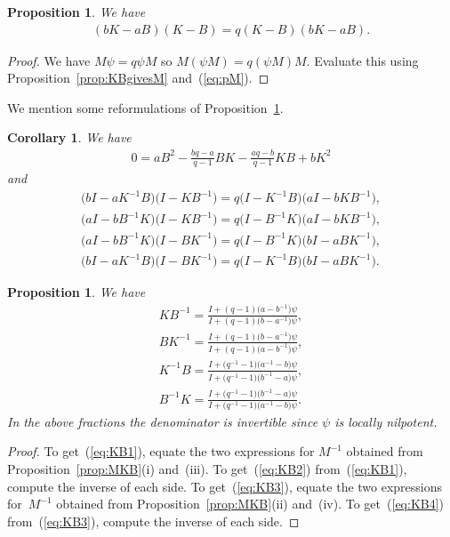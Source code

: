 \documentclass[pdftex]{sigma}
\numberwithin{equation}{section}
\newtheorem{Corollary}[Theorem]{Corollary}
\newtheorem{Proposition}[Theorem]{Proposition}
\begin{document}
\begin{Proposition}\label{thm:BKBK}
We have
\begin{gather*}
(bK-aB)(K-B) = q(K-B)(bK-aB).
\end{gather*}
\end{Proposition}
\begin{proof} We have $M\psi = q \psi M$ so
$M (\psi M) = q (\psi M) M$.
Evaluate this using Proposition~\ref{prop:KBgivesM} and~(\ref{eq:pM}).
\end{proof}

We mention some reformulations of Proposition~\ref{thm:BKBK}.

\begin{Corollary}\label{lem:altrel}
We have
\begin{gather*}
0 = aB^2-\frac{bq-a}{q-1} BK - \frac{aq-b}{q-1}KB + bK^2
\end{gather*}
and
\begin{gather*}
\big(bI-aK^{-1}B\big)\big(I-KB^{-1}\big) = q \big(I-K^{-1}B\big)\big(aI-bKB^{-1}\big),
\\
\big(aI-bB^{-1}K\big)\big(I-KB^{-1}\big) = q \big(I-B^{-1}K\big)\big(aI-bKB^{-1}\big),
\\
\big(aI-bB^{-1}K\big)\big(I-BK^{-1}\big) = q \big(I-B^{-1}K\big)\big(bI-aBK^{-1}\big),
\\
\big(bI-aK^{-1}B\big)\big(I-BK^{-1}\big) = q \big(I-K^{-1}B\big)\big(bI-aBK^{-1}\big).
\end{gather*}
\end{Corollary}

\begin{Proposition}\label{prop:KBi}
We have
\begin{gather}
KB^{-1} = \frac{I + (q-1)\big(a-b^{-1}\big)\psi}{I + (q-1)\big(b-a^{-1}\big)\psi},
\label{eq:KB1}
\\
BK^{-1} = \frac
{I + (q-1)\big(b-a^{-1}\big)\psi}
{I + (q-1)\big(a-b^{-1}\big)\psi},
\label{eq:KB2}
\\
K^{-1}B = \frac{I + \big(q^{-1}-1\big)\big(a^{-1}-b\big)\psi}{I + \big(q^{-1}-1\big)\big(b^{-1}-a\big)\psi},
\label{eq:KB3}
\\
B^{-1}K = \frac
{I + \big(q^{-1}-1\big)\big(b^{-1}-a\big)\psi}
{I + \big(q^{-1}-1\big)\big(a^{-1}-b\big)\psi}.
\label{eq:KB4}
\end{gather}
In the above fractions the denominator is invertible since
$\psi$ is locally nilpotent.
\end{Proposition}
\begin{proof} To get~(\ref{eq:KB1}),
equate the two expressions for $M^{-1}$ obtained from
Proposition~\ref{prop:MKB}(i) and~(iii).
To get~(\ref{eq:KB2}) from~(\ref{eq:KB1}), compute the inverse of each side.
To get~(\ref{eq:KB3}),
equate the two expressions for~$M^{-1}$
obtained from Proposition~\ref{prop:MKB}(ii) and~(iv).
To get~(\ref{eq:KB4}) from~(\ref{eq:KB3}), compute the inverse of
each side.
\end{proof}
\end{document}
